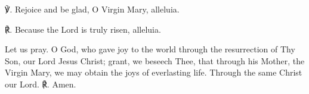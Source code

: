 \begin{enpars}


℣. Rejoice and be glad, O Virgin Mary, alleluia.

℟. Because the Lord is truly risen, alleluia.

Let us pray. O God, who gave joy to the world through the resurrection of Thy Son, our Lord Jesus Christ; grant, we beseech Thee, that through his Mother, the Virgin Mary, we may obtain the joys of everlasting life. Through the same Christ our Lord. ℟. Amen.
\end{enpars}